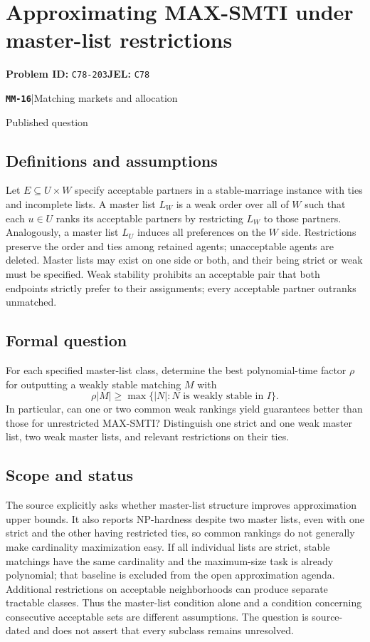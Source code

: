 \documentclass[11pt,a4paper]{article}
\newcommand{\entrymeta}[3]{{\sffamily\small\color{muted}\textbf{\texttt{#1}}\quad|\quad #2\par #3\par}}
\begin{document}
\section*{Approximating MAX-SMTI under master-list restrictions}
\textbf{Problem ID:} \texttt{C78-203}\quad \textbf{JEL:} \texttt{C78}\par
\label{problem:OP-0557}
\label{beyond:MM-16}
\entrymeta{MM-16}{Matching markets and allocation}{Published question}
\subsection*{Definitions and assumptions}
Let $E\subseteq U\times W$ specify acceptable partners in a stable-marriage instance with ties and incomplete lists. A master list $L_W$ is a weak order over all of $W$ such that each $u\in U$ ranks its acceptable partners by restricting $L_W$ to those partners. Analogously, a master list $L_U$ induces all preferences on the $W$ side. Restrictions preserve the order and ties among retained agents; unacceptable agents are deleted. Master lists may exist on one side or both, and their being strict or weak must be specified. Weak stability prohibits an acceptable pair that both endpoints strictly prefer to their assignments; every acceptable partner outranks unmatched.
\subsection*{Formal question}
For each specified master-list class, determine the best polynomial-time factor $\rho$ for outputting a weakly stable matching $M$ with
\[
 \rho|M|\ge\max\{|N|:N\text{ is weakly stable in }I\}.
\]
In particular, can one or two common weak rankings yield guarantees better than those for unrestricted MAX-SMTI? Distinguish one strict and one weak master list, two weak master lists, and relevant restrictions on their ties.
\subsection*{Scope and status}
The source explicitly asks whether master-list structure improves approximation upper bounds. It also reports NP-hardness despite two master lists, even with one strict and the other having restricted ties, so common rankings do not generally make cardinality maximization easy. If all individual lists are strict, stable matchings have the same cardinality and the maximum-size task is already polynomial; that baseline is excluded from the open approximation agenda. Additional restrictions on acceptable neighborhoods can produce separate tractable classes. Thus the master-list condition alone and a condition concerning consecutive acceptable sets are different assumptions. The question is source-dated and does not assert that every subclass remains unresolved.
\end{document}
